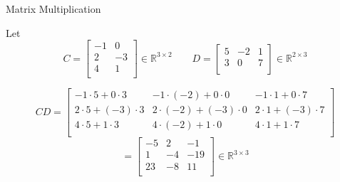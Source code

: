 \documentclass{beamer}
\newcommand{\R}{\mathbb{R}}
\begin{document}
\begin{frame}{Matrix Multiplication}

  \begin{example}
    Let
    \[
      C = \begin{bmatrix}
        -1 & 0 \\
        2 & -3 \\
        4 & 1 \\
      \end{bmatrix}\in \R^{3 \times 2}
      \qquad
      D = \begin{bmatrix}
        5 & -2 & 1 \\
        3 & 0 & 7 \\
      \end{bmatrix}\in \R^{2 \times 3}
    \]

    \[
      CD = \begin{bmatrix}
        -1 \cdot 5 + 0 \cdot 3 & -1 \cdot (-2) + 0 \cdot 0 & -1 \cdot 1 + 0 \cdot 7 \\
        2 \cdot 5 + (-3) \cdot 3 & 2 \cdot (-2) + (-3) \cdot 0 & 2 \cdot 1 + (-3) \cdot 7 \\
        4 \cdot 5 + 1 \cdot 3 & 4 \cdot (-2) + 1 \cdot 0 & 4 \cdot 1 + 1 \cdot 7 \\
      \end{bmatrix}
     \]\[ = \begin{bmatrix}
        -5 & 2 & -1 \\
        1 & -4 & -19 \\
        23 & -8 & 11 \\
      \end{bmatrix}\in\R^{3 \times 3}
    \]
  \end{example}

\end{frame}
\end{document}
